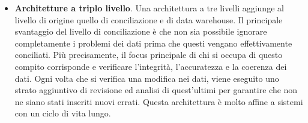 \begin{itemize}
\begin{enumerate}
            \item La \textit{profilazione dei dati}\footnote{La \textit{profilazione dei dati} è il processo di esame dei dati disponibili da una fonte di informazioni esistente e la raccolta di statistiche o riepiloghi formativi su tali dati.\cite{wikipedia_data_profiling}} è l’ultimo livello poiché si occupa di convalidare l’integrità dei dati e gli standard di una possibile presentazione. Esso comprende anche analisi avanzate come la generazione di rapporti in tempo reale e batch e le visualizzazioni.
        \end{enumerate}
    \item \textbf{Architetture a triplo livello}. Una architettura a tre livelli aggiunge al livello di origine quello di conciliazione e di data warehouse. Il principale svantaggio del livello di conciliazione è che non sia possibile ignorare completamente i problemi dei dati prima che questi vengano effettivamente conciliati. Più precisamente, il focus principale di chi si occupa di questo compito corrisponde e verificare l’integrità, l’accuratezza e la coerenza dei dati. Ogni volta che si verifica una modifica nei dati, viene eseguito uno strato aggiuntivo di revisione ed analisi di quest'ultimi per garantire che non ne siano stati inseriti nuovi errati. Questa architettura è molto affine a sistemi con un ciclo di vita lungo.
\end{itemize}

